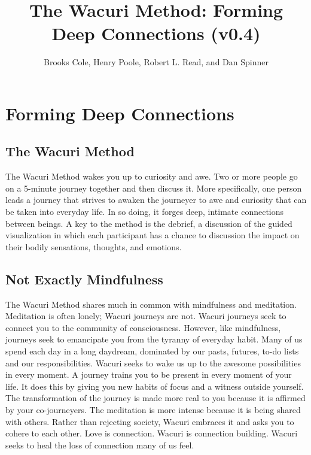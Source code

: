 \documentclass[12pt]{book}
\begin{document}
\title{The Wacuri Method: Forming Deep Connections (v0.4)}

\author{Brooks Cole, Henry Poole, Robert L. Read, and Dan Spinner}
\date{ }

\maketitle
\tableofcontents


\chapter{Forming Deep Connections}

\section{The Wacuri Method}
The Wacuri Method wakes you up to curiosity and awe.
Two or more people go on a 5-minute journey together and then discuss it.
More specifically, one person leads a journey that strives to awaken the
journeyer to awe and curiosity that can be taken into everyday life.
In so doing, it forges deep, intimate connections between beings.
A key to the method is the debrief, a discussion of the guided visualization
in which each participant has a chance to discussion the impact on their
bodily sensations, thoughts, and emotions.

\section{Not Exactly Mindfulness}

The Wacuri Method shares much in common with mindfulness and meditation.
Meditation is often lonely; Wacuri journeys are not. Wacuri journeys
seek to connect you to the community of consciousness. However,
like mindfulness, journeys seek to emancipate you from the tyranny
of everyday habit. Many of us spend each day in a long daydream, dominated
by our pasts, futures, to-do lists and our responsibilities. Wacuri seeks to wake
us up to the awesome possibilities in every moment. A journey trains you
to be present in every moment of your life. It does this by giving
you new habits of focus and
a witness outside yourself. The transformation of the journey
is made more real to you because it is affirmed by your co-journeyers.
The meditation is more intense because it is being shared with others.
Rather than rejecting society, Wacuri embraces it and asks you
to cohere to each other. Love is connection. Wacuri is
connection building. Wacuri seeks to heal the loss of connection
many of us feel.
\end{document}
